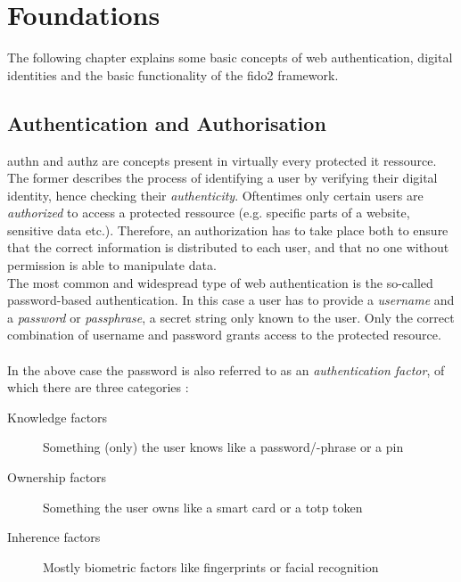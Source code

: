 
\section{Foundations}
\label{sec:foundations}

The following chapter explains some basic concepts of web authentication, digital identities and the basic functionality of the \ac{fido2} framework.

\subsection{Authentication and Authorisation}
\label{subsec:authn_authz}

\ac{authn} and \ac{authz} are concepts present in virtually every protected \ac{it} ressource.
The former describes the process of identifying a user by verifying their digital identity, hence checking their \emph{authenticity}. Oftentimes only certain users are \emph{authorized} to access a protected ressource (e.g. specific parts of a website, sensitive data etc.). Therefore, an authorization has to take place both to ensure that the correct information is distributed to each user, and that no one without permission is able to manipulate data.\\
The most common and widespread type of web authentication is the so-called password-based authentication. In this case a user has to provide a \emph{username} and a \emph{password} or \emph{passphrase}, a secret string only known to the user.
Only the correct combination of username and password grants access to the protected resource.\\
\\
In the above case the password is also referred to as an \emph{authentication factor}, of which there are three categories \cite{turner2016}:

\begin{description}
    \item[Knowledge factors] Something (only) the user knows like a password/-phrase or a \ac{pin}
    \item[Ownership factors] Something the user owns like a smart card or a \ac{totp} token
    \item[Inherence factors] Mostly biometric factors like fingerprints or facial recognition
\end{description}

